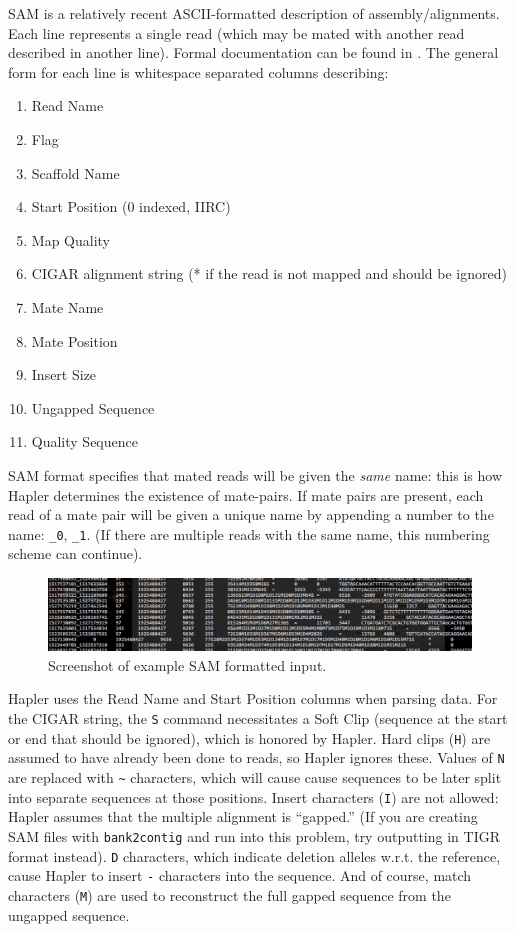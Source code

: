 \documentclass[11pt]{llncs}
\begin{document}
\label{exampleSamInputFormat}

SAM is a relatively recent ASCII-formatted description of assembly/alignments. Each line represents a single read (which may be mated with another
read described in another line). Formal documentation can be found in \cite{LI2009}. The general form for each line is whitespace separated columns 
describing:

\begin{enumerate}
	\item Read Name
	\item Flag
	\item Scaffold Name
	\item Start Position (0 indexed, IIRC)
	\item Map Quality
	\item CIGAR alignment string (* if the read is not mapped and should be ignored)
	\item Mate Name
	\item Mate Position
	\item Insert Size
	\item Ungapped Sequence
	\item Quality Sequence
\end{enumerate}

SAM format specifies that mated reads will be given the \emph{same} name: this is how Hapler determines the existence of mate-pairs. 
If mate pairs are present, each read of a mate pair will be given a unique name by appending a number to the name:
\verb=_0=, \verb=_1=. (If there are multiple reads with the same name, this numbering scheme can continue).

\begin{figure}[!h]
\centering
   \includegraphics[width=\textwidth]{graphics/Example_sam}
   \caption{Screenshot of example SAM formatted input.}
   \label{exampleSAM}
\end{figure}

Hapler uses the Read Name and Start Position columns when parsing data. For the CIGAR string, the \verb=S= command necessitates a Soft Clip (sequence 
at the start or end that should be ignored), which is honored by Hapler. Hard clips (\verb=H=) are assumed to have already been done to reads, so 
Hapler ignores these. Values of \verb=N= are replaced with \verb=~= characters, which will cause cause sequences to be later split into separate 
sequences at those positions. Insert characters (\verb=I=) are not allowed: Hapler assumes that the multiple alignment is ``gapped.'' (If you are 
creating SAM files with \texttt{bank2contig} and run into this problem, try outputting in TIGR format instead). \verb=D= characters, which indicate 
deletion alleles w.r.t. the reference, cause Hapler to insert \verb=-= characters into the sequence. And of course, match characters (\verb=M=) are 
used to reconstruct the full gapped sequence from the ungapped sequence.
\end{document}
